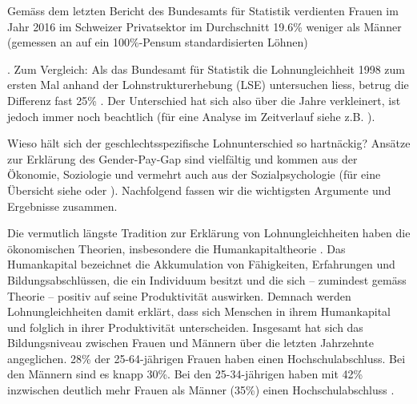 \documentclass[a4paper,12pt]{article}
\renewcommand{\baselinestretch}{1.1}
\newif\ifcomments
\newcommand{\comment}[1]{%
    \ifcomments\marginpar{\renewcommand{\baselinestretch}{1}\tiny\hspace*{-1.1em}\colorbox{gray!20}%
    {\textcolor{red}{\parbox[t]{.9in}{\raggedright #1}}}}\fi}
\begin{document}
\comment{Hinweis auf Heiratsrecht bis 1988: “Note that this arrangement was enshrined 
in Switzerland’s marriage law until 1988, giving husbands the status as legal 
head of family from whom wives needed the consent in order to take on paid employment.” 
(Paper von Benita und Oli Oesch im ESR; das paper sollte irgendwo zitiert werden)}

\comment{cite „Oesch:2017“ somewhere; see bibtex file}

\comment{OK, beide Artikel zitiert.}

Gemäss dem letzten Bericht des Bundesamts für Statistik verdienten Frauen im
Jahr 2016 im Schweizer Privatsektor im Durchschnitt 19.6\% weniger als Männer
(gemessen an auf ein 100\%-Pensum standardisierten Löhnen) \comment{Zahlen aktualisieren? -> Zahlen aktualisiert.}
\citep{BFS-2019a}. Zum Vergleich: Als das Bundesamt für Statistik die
Lohnungleichheit 1998 zum ersten Mal anhand der Lohnstrukturerhebung (LSE)
untersuchen liess, betrug die Differenz fast 25\% \citep{Strub-etal-2006}. Der
Unterschied hat sich also über die Jahre verkleinert, ist jedoch immer noch
beachtlich (für eine Analyse im Zeitverlauf siehe z.B. \citealp{Schmid-2016}).

Wieso hält sich der geschlechtsspezifische Lohnunterschied so hartnäckig?
Ansätze zur Erklärung des Gender-Pay-Gap sind vielfältig und kommen aus der
Ökonomie, Soziologie und vermehrt auch aus der Sozialpsychologie (für eine
Übersicht siehe \citealp{Blau-Kahn-2017} oder
\citealp{Weichselbaumer-Winter-Ebmer-2005}). Nachfolgend fassen wir die
wichtigsten Argumente und Ergebnisse zusammen.
\comment{Die nachfolgenden Ausführungen stark verdichten; max 2-3 Seiten}


Die vermutlich längste Tradition zur Erklärung von Lohnungleichheiten haben die
ökonomischen Theorien, insbesondere die Humankapitaltheorie \citep{Becker-1975,
Mincer-1958,Mincer-Polachek-1974}. Das Humankapital bezeichnet die Akkumulation
von Fähigkeiten, Erfahrungen und Bildungsabschlüssen, die ein Individuum
besitzt und die sich -- zumindest gemäss Theorie -- positiv auf seine
Produktivität auswirken. Demnach werden Lohnungleichheiten damit erklärt, dass
sich Menschen in ihrem Humankapital und folglich in ihrer Produktivität
unterscheiden. 
Insgesamt hat sich das Bildungsniveau zwischen Frauen und Männern über die letzten Jahrzehnte angeglichen. 28\% der 25-64-jährigen Frauen haben einen Hochschulabschluss. Bei den Männern sind es knapp 30\%. Bei den 25-34-jährigen haben mit 42\% inzwischen deutlich mehr Frauen als Männer (35\%) einen Hochschulabschluss \citep{BFS-2019b}. 
\end{document}
